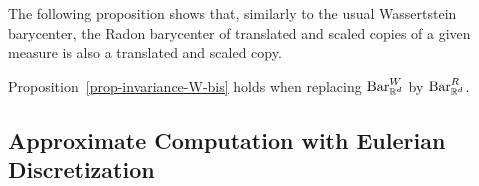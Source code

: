 The following proposition shows that, similarly to the usual Wassertstein barycenter, the Radon barycenter of translated and scaled copies of a given measure is also a translated and scaled copy.

\begin{prop}
\label{prop:InvarianceHoldsBis}
	Proposition~\ref{prop-invariance-W-bis} holds when replacing $\text{\upshape Bar}_{\mathbb{R}^d}^W$ by $\text{\upshape Bar}_{\mathbb{R}^d}^R$.
\end{prop}


\subsection{Approximate Computation with Eulerian Discretization}
\label{subsec-algorithm-eulerian}


